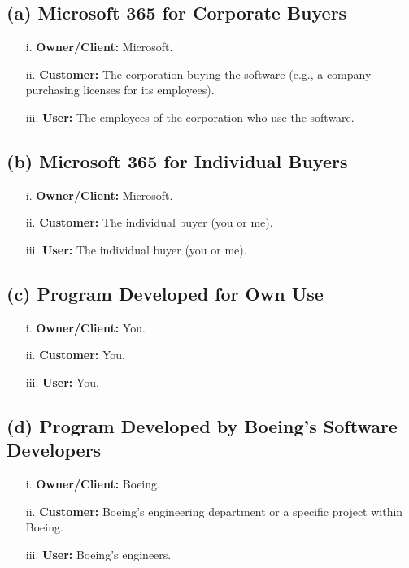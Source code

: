 \documentclass{article}
\begin{document}
\subsection*{(a) Microsoft 365 for Corporate Buyers}

\begin{itemize}
    \item[i.] \textbf{Owner/Client:} Microsoft.
    \item[ii.] \textbf{Customer:} The corporation buying the software (e.g., a company purchasing licenses for its employees).
    \item[iii.] \textbf{User:} The employees of the corporation who use the software.
\end{itemize}

\subsection*{(b) Microsoft 365 for Individual Buyers}

\begin{itemize}
    \item[i.] \textbf{Owner/Client:} Microsoft.
    \item[ii.] \textbf{Customer:} The individual buyer (you or me).
    \item[iii.] \textbf{User:} The individual buyer (you or me).
\end{itemize}

\subsection*{(c) Program Developed for Own Use}

\begin{itemize}
    \item[i.] \textbf{Owner/Client:} You.
    \item[ii.] \textbf{Customer:} You.
    \item[iii.] \textbf{User:} You.
\end{itemize}

\subsection*{(d) Program Developed by Boeing's Software Developers}

\begin{itemize}
    \item[i.] \textbf{Owner/Client:} Boeing.
    \item[ii.] \textbf{Customer:} Boeing's engineering department or a specific project within Boeing.
    \item[iii.] \textbf{User:} Boeing's engineers.
\end{itemize}
\end{document}
